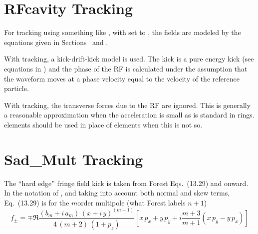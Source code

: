 \section{RFcavity Tracking}
\label{s:rfcavity.std}

For tracking using something like , with  set to ,
the fields are modeled by the equations given in Sections~ and .

With  tracking, a kick-drift-kick model is used. The kick is a
pure energy kick (see equations in ) and the phase of the RF is calculated under the
assumption that the waveform moves at a phase velocity equal to the velocity of the reference
particle.

With  tracking, the transverse forces due to the RF are ignored. This is generally
a reasonable approximation when the acceleration is small as is standard in rings. 
elements should be used in place of  elements when this is not so.

\section{Sad\_Mult Tracking}
\label{s:sad.mult.std}

The ``hard edge'' fringe field kick is taken from Forest\cite{b:forest} Eqs.~(13.29) and onward.
In the notation of \bmad, and taking into account both normal and skew terms, Eq.~(13.29)
is for the $m$\th order multipole (what Forest labels $n+1$)
\begin{equation}
  f_\pm = \mp \Re \frac{(b_m + i \, a_m) \, (x + i \, y)^{(m+1)}}{4 \, (m+2) \, (1 + p_z)}
    \left[ x \, p_x + y \, p_y + i\frac{m+3}{m+1}(x \, p_y - y \, p_x) \right]
\end{equation}

